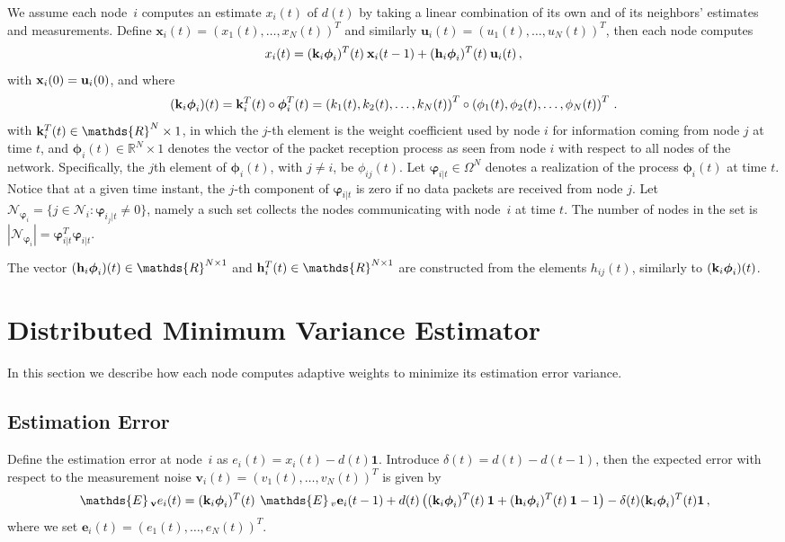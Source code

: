 \documentclass[a4paper,notitlepage,onecolumn]{article}
\def\1{\mathbf{1}}
\def\R{\mathds{R}}
\def\x{{\bf x}}
\def\u{{\bf u}}
\def\k{{\bf k}}
\def\h{{\bf h}}
\def\v{{\bf v}}
\def\phib{\boldsymbol{\phi}}
\def\varphib{\boldsymbol{\varphi}}
\def\E{\,\mathds{E}\,}
\numberwithin{equation}{section}
\begin{document}
We assume each node~$i$ computes an estimate $x_i(t)$ of
$d(t)$ by taking a linear combination of its own and of its
neighbors' estimates and measurements. Define $\mathbf{x}_i(t) =
(x_{1}(t),\dots,x_{N}(t))^T$ and similarly $\mathbf{u}_i(t) =
(u_{1}(t),\dots,u_{N}(t))^T$, then each node computes
\begin{align}\label{eq:system_dyn}
    x_i(t)=(\k_{i}\phib_i)^T(t)\:\mathbf{x}_i(t-1)+(\h_i\phib_i)^T(t)\:\mathbf{u}_i(t)\,,
\end{align}
with $\x_i(0) = \u_i(0)$, and where
$$
    (\k_{i}\phib_i)(t) = \k_i^T(t) \circ \phib_i^T(t) =
    \left(k_{1}(t),k_{2}(t),\dots,k_{N}(t)\right)^T \circ
    \left(\phi_{1}(t),\phi_{2}(t),\dots,\phi_{N}(t)\right)^T\,.
$$
with $\k_i^T(t) \in\R^{N} \times 1$, in which the $j$-th element
is the weight coefficient used by node $i$ for information coming
from node $j$ at time $t$, and  $\phib_i(t)\in\R^{N} \times 1$
denotes the vector of the packet reception process as seen from
node $i$ with respect to all nodes of the network. Specifically,
the $j$th element of $\phib_i(t)$, with $j\neq i$, be
$\phi_{ij}(t)$. Let $\varphib_{i|t} \in\Omega^N $ denotes a
realization of the process $\phib_i(t)$ at time $t$. Notice that
at a given time instant, the $j$-th component of $\varphib_{i|t}$
is zero if no data packets are received from node $j$. Let
$\mathcal{N}_{\varphib_i}=\{j \in \mathcal{N}_i: \varphib_{i_j|t}
\neq 0\}$, namely a such set collects the nodes communicating with
node~$i$ at time $t$. The number of nodes in the set is
$|\mathcal{N}_{\varphib_i}|=\varphib_{i|t}^T\varphib_{i|t}$.

The vector $(\h_i\phib_i)(t) \in\R^{N \times 1} $ and $\h_i^T(t) \in\R^{N \times 1}$ are constructed from the elements $h_{ij}(t)$, similarly to $(\k_{i}\phib_i)(t)$.



\section{Distributed Minimum Variance Estimator}
\label{sec:distrib_min_var_estim} In this section we
describe how each node computes adaptive weights to
minimize its estimation error variance.

\subsection{Estimation Error}

Define the estimation error at node~$i$ as $e_i(t) = x_i(t) - d(t)\1$.
Introduce $\delta(t) = d(t)- d(t-1)$, then the expected error with respect to the measurement noise $\mathbf{v}_i(t)=(v_1(t),\dots,v_{N}(t))^T$ is given by
\begin{align}
    \E_\v e_i(t) = (\k_{i}\phib_i)^T(t)\: \E_v \mathbf{e}_i(t-1) +
    d(t)\left((\k_{i}\phib_i)^T(t)\:\1 + (\h_{i}\phib_i)^T(t)\:\1 - 1
    \right)- \delta(t)(\k_{i}\phib_i)^T(t) \1\,,
    \label{eq:err_dyn}
\end{align}
where we set $\mathbf{e}_i(t)=(e_{1}(t),\dots,e_{N}(t))^T$.
\end{document}
